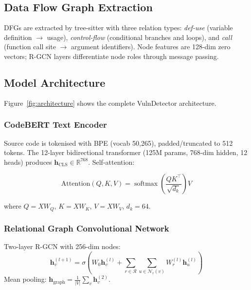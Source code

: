 \documentclass[12pt, letterpaper]{article}
\begin{document}
\subsection{Data Flow Graph Extraction}

DFGs are extracted by tree-sitter with three relation types:
\emph{def-use} (variable definition $\to$ usage),
\emph{control-flow} (conditional branches and loops),
and \emph{call} (function call site $\to$ argument identifiers).
Node features are 128-dim zero vectors; R-GCN layers differentiate
node roles through message passing.

\subsection{Model Architecture}

Figure~\ref{fig:architecture} shows the complete VulnDetector architecture.



\subsubsection{CodeBERT Text Encoder}

Source code is tokenised with BPE (vocab 50,265), padded/truncated to 512
tokens. The 12-layer bidirectional transformer (125M params, 768-dim hidden,
12 heads) produces $\mathbf{h}_{\text{CLS}}\in\mathbb{R}^{768}$. Self-attention:

\begin{equation}
\text{Attention}(Q,K,V)=
  \operatorname{softmax}\!\left(\frac{QK^\top}{\sqrt{d_k}}\right)V
\label{eq:attention}
\end{equation}

where $Q{=}XW_Q$, $K{=}XW_K$, $V{=}XW_V$, $d_k{=}64$.

\subsubsection{Relational Graph Convolutional Network}

Two-layer R-GCN with 256-dim nodes:
\begin{equation}
\mathbf{h}_v^{(l+1)}=\sigma\!\left(
  W_0\mathbf{h}_v^{(l)}+
  \sum_{r\in\mathcal{R}}\sum_{u\in\mathcal{N}_r(v)}W_r^{(l)}\mathbf{h}_u^{(l)}
\right)
\label{eq:rgcn}
\end{equation}
Mean pooling: $\mathbf{h}_{\text{graph}}=\frac{1}{|V|}\sum_{v}\mathbf{h}_v^{(2)}$.
\end{document}
